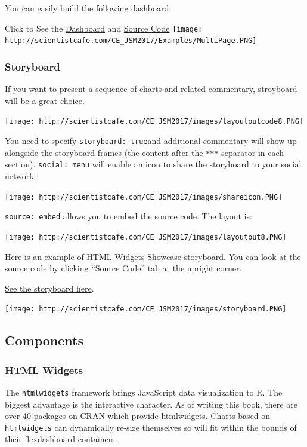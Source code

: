 \documentclass[]{book}
\theoremstyle{definition}
\theoremstyle{definition}
\theoremstyle{remark}
\begin{document}
You can easily build the following dashboard:

Click to See the
\href{http://scientistcafe.com/CE_JSM2017/Examples/dashboard_multi-page.html}{Dashboard}
and
\href{https://raw.githubusercontent.com/happyrabbit/linhui.org/gh-pages/CE_JSM2017/Examples/dashboard_multi-page.Rmd}{Source
Code}
\texttt{[image: http://scientistcafe.com/CE\_JSM2017/Examples/MultiPage.PNG]}

\subsubsection{Storyboard}\label{storyboard}

If you want to present a sequence of charts and related commentary,
stroyboard will be a great choice.

\texttt{[image: http://scientistcafe.com/CE\_JSM2017/images/layoutputcode8.PNG]}

You need to specify \texttt{storyboard:\ true}and additional commentary
will show up alongside the storyboard frames (the content after the
\texttt{***} separator in each section). \texttt{social:\ menu} will
enable an icon to share the storyboard to your social network:

\texttt{[image: http://scientistcafe.com/CE\_JSM2017/images/shareicon.PNG]}

\texttt{source:\ embed} allows you to embed the source code. The layout
is:

\texttt{[image: http://scientistcafe.com/CE\_JSM2017/images/layoutput8.PNG]}

Here is an example of HTML Widgets Showcase storyboard. You can look at
the source code by clicking ``Source Code'' tab at the upright corner.

\href{http://scientistcafe.com/CE_JSM2017/Examples/storyboard.html}{See
the storyboard here}.

\texttt{[image: http://scientistcafe.com/CE\_JSM2017/images/storyboard.PNG]}

\subsection{Components}\label{components}

\subsubsection{HTML Widgets}\label{html-widgets}

The \texttt{htmlwidgets} framework brings JavaScript data visualization
to R. The biggest advantage is the interactive character. As of writing
this book, there are over 40 packages on CRAN which provide htmlwidgets.
Charts based on \texttt{htmlwidgets} can dynamically re-size themselves
so will fit within the bounds of their flexdashboard containers.
\end{document}
